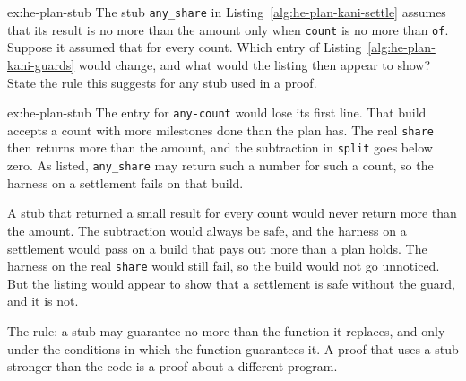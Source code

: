 \documentclass[11pt,a4paper]{article}
\theoremstyle{definition}
\theoremstyle{definition}
\theoremstyle{remark}
\begin{document}
\begin{pdexercise}[kind=Check,rating=2]{ex:he-plan-stub}
The stub \texttt{any\_share} in Listing~\ref{alg:he-plan-kani-settle} assumes that its result is no more than the amount only when \texttt{count} is no more than \texttt{of}. Suppose it assumed that for every count. Which entry of Listing~\ref{alg:he-plan-kani-guards} would change, and what would the listing then appear to show? State the rule this suggests for any stub used in a proof.
\end{pdexercise}
\begin{pdsolution}{ex:he-plan-stub}
The entry for \texttt{any-count} would lose its first line. That build accepts a count with more milestones done than the plan has. The real \texttt{share} then returns more than the amount, and the subtraction in \texttt{split} goes below zero. As listed, \texttt{any\_share} may return such a number for such a count, so the harness on a settlement fails on that build.

A stub that returned a small result for every count would never return more than the amount. The subtraction would always be safe, and the harness on a settlement would pass on a build that pays out more than a plan holds. The harness on the real \texttt{share} would still fail, so the build would not go unnoticed. But the listing would appear to show that a settlement is safe without the guard, and it is not.

The rule: a stub may guarantee no more than the function it replaces, and only under the conditions in which the function guarantees it. A proof that uses a stub stronger than the code is a proof about a different program.
\end{pdsolution}

\end{document}
